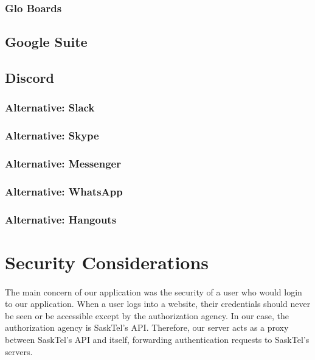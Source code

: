 \documentclass[12pt]{article}
\begin{document}
\subsubsection{Glo Boards}

\subsection{Google Suite}

\subsection{Discord}

\subsubsection{Alternative: Slack}

\subsubsection{Alternative: Skype}

\subsubsection{Alternative: Messenger}

\subsubsection{Alternative: WhatsApp}

\subsubsection{Alternative: Hangouts}

\newpage
\section{Security Considerations}
\paragraph{}
	The main concern of our application was the security of a user who would login to our application. When a user logs into a website, their credentials should never be seen or be accessible except by the authorization agency. In our case, the authorization agency is SaskTel's API. Therefore, our server acts as a proxy between SaskTel's API and itself, forwarding authentication requests to SaskTel's servers.
\end{document}
